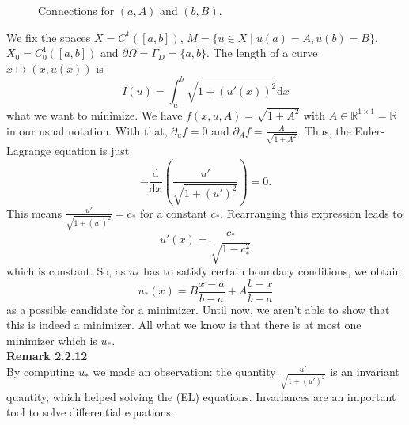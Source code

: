 \begin{figure}[ht]
	\centering
	\caption{Connections for $(a,A)$ and $(b,B)$.}
	\label{fig:example_2_2_11}
\end{figure}

We fix the spaces $X=C^1([a,b])$, $M=\{u\in X\mid u(a)=A,u(b)=B\}$, $X_0=C_0^1([a,b])$ and $\partial\Omega=\Gamma_D=\{a,b\}$. The length of a curve $x\mapsto(x,u(x))$ is
\[I(u)=\int_a^b{\sqrt{1+(u'(x))^2}\mathrm{d}x}\]
what we want to minimize. We have $f(x,u,A)=\sqrt{1+A^2}$ with $A\in\mathbb{R}^{1\times 1}=\mathbb{R}$ in our usual notation. With that, $\partial_uf=0$ and $\partial_Af=\frac{A}{\sqrt{1+A^2}}$. Thus, the Euler-Lagrange equation is just
\[-\frac{\mathrm{d}}{\mathrm{d}x}\left(\frac{u'}{\sqrt{1+(u')^2}}\right)=0.\]
This means $\frac{u'}{\sqrt{1+(u')^2}}=c_*$ for a constant $c_*$. Rearranging this expression leads to
\[u'(x)=\frac{c_*}{\sqrt{1-c_*^2}}\]
which is constant. So, as $u_*$ has to satisfy certain boundary conditions, we obtain
\[u_*(x)=B\frac{x-a}{b-a}+A\frac{b-x}{b-a}\]
as a possible candidate for a minimizer. Until now, we aren't able to show that this is indeed a minimizer. All what we know is that there is at most one minimizer which is $u_*$.\\[11pt]

\textbf{Remark 2.2.12}\\
By computing $u_*$ we made an observation: the quantity $\frac{u'}{\sqrt{1+(u')^2}}$ is an invariant quantity, which helped solving the (EL) equations. Invariances are an important tool to solve differential equations.\\[11pt]

